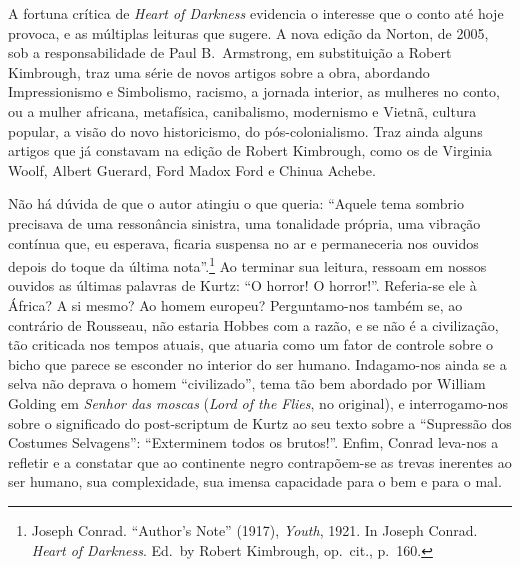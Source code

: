 A fortuna crítica de \textit{Heart of Darkness} evidencia o interesse
que o conto até hoje provoca, e as múltiplas leituras que sugere. A
nova edição da Norton, de 2005, sob a responsabilidade de Paul B.~Armstrong, 
em substituição a Robert Kimbrough, traz uma série de novos
artigos sobre a obra, abordando Impressionismo e Simbolismo, racismo, 
a jornada interior, as mulheres no conto, ou a mulher africana,
metafísica, canibalismo, modernismo e Vietnã, cultura popular, a visão
do novo historicismo, do pós{}-colonialismo. Traz ainda alguns artigos
que já constavam na edição de Robert Kimbrough, como  os de Virginia
Woolf, Albert Guerard, Ford Madox Ford e Chinua Achebe.

Não há dúvida de que o autor atingiu o que queria: ``Aquele tema
sombrio precisava de uma ressonância sinistra, uma tonalidade própria,
uma vibração contínua que, eu esperava, ficaria suspensa no ar e
permaneceria nos ouvidos depois do toque da última
nota''.\footnote{ Joseph Conrad. ``Author's Note'' (1917), \textit{Youth}, 
1921. In Joseph Conrad. \textit{Heart of Darkness}. Ed.~by Robert Kimbrough, op.~cit., p.~160.}
Ao terminar sua leitura, ressoam em nossos ouvidos as últimas
palavras de Kurtz: ``O horror! O  horror!''. Referia{}-se ele à África? A
si mesmo? Ao homem europeu? Perguntamo{}-nos também  se, ao contrário
de Rousseau, não estaria Hobbes com a razão, e  se não é a civilização,
tão criticada nos tempos atuais, que atuaria como um fator de controle
sobre o bicho que parece se esconder no interior do ser humano.
Indagamo{}-nos ainda se a selva não deprava o homem ``civilizado'', tema 
tão bem abordado por \mbox{William} Golding em \textit{Senhor das moscas} 
(\textit{Lord of the Flies}, no original), e interrogamo{}-nos sobre o significado do post{}-scriptum
de Kurtz ao seu texto sobre a ``Supressão dos Costumes Selvagens'':
``Exterminem  todos os brutos!''.  Enfim, Conrad leva{}-nos a refletir e a
constatar que ao continente negro contrapõem{}-se as trevas inerentes
ao ser humano, sua complexidade, sua imensa capacidade para o bem e para o mal.




